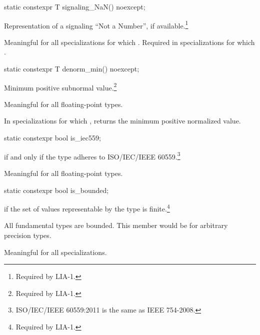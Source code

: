 %
\begin{itemdecl}
static constexpr T signaling_NaN() noexcept;
\end{itemdecl}

\begin{itemdescr}
\pnum
Representation of a signaling ``Not a Number'', if available.\footnote{Required by LIA-1.}

\pnum
Meaningful for all specializations for which
.
Required in specializations for which
.
\end{itemdescr}

%
\begin{itemdecl}
static constexpr T denorm_min() noexcept;
\end{itemdecl}

\begin{itemdescr}
%
\pnum
Minimum positive subnormal value.\footnote{Required by LIA-1.}

\pnum
Meaningful for all floating-point types.

\pnum
In specializations for which
,
returns the minimum positive normalized value.
\end{itemdescr}

%
\begin{itemdecl}
static constexpr bool is_iec559;
\end{itemdecl}

\begin{itemdescr}
\pnum
{} if and only if the type adheres to ISO/IEC/IEEE
60559.\footnote{ISO/IEC/IEEE 60559:2011 is the same as IEEE 754-2008.}

\pnum
Meaningful for all floating-point types.
\end{itemdescr}

%
\begin{itemdecl}
static constexpr bool is_bounded;
\end{itemdecl}

\begin{itemdescr}
\pnum
{} if the set of values representable by the type is finite.\footnote{Required by LIA-1.}
\begin{note}
All fundamental types are bounded. This member would be  for arbitrary
precision types.
\end{note}

\pnum
Meaningful for all specializations.
\end{itemdescr}


